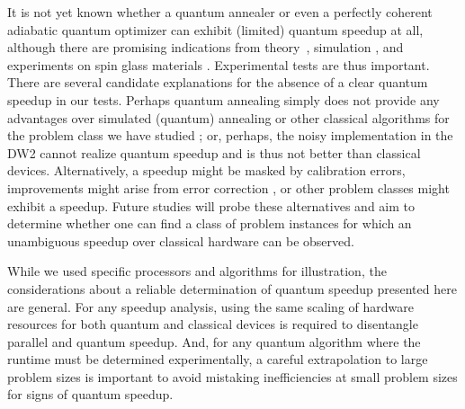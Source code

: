 It is not yet known whether a quantum annealer or even a perfectly coherent adiabatic quantum optimizer can exhibit (limited) quantum speedup at all, although there are promising indications from theory~\cite{Somma:2012kx}, simulation \cite{Santoro}, and experiments on spin glass materials \cite{Brooke1999}. Experimental tests are thus important. 
There are several candidate explanations for the absence of a clear quantum speedup in our tests. Perhaps quantum annealing simply does not provide any advantages over simulated (quantum) annealing or other classical algorithms for the problem class we have studied \cite{2014Katzgraber}; or, perhaps, the noisy implementation in the DW2 cannot realize quantum speedup and is thus not better than classical devices. Alternatively, a speedup might be masked by calibration errors, improvements might arise from error correction \cite{PAL:13}, or other problem classes might exhibit a speedup. Future studies will probe these alternatives and aim to determine whether one can find a class of problem instances for which an unambiguous speedup over classical hardware can be observed. 

While we used specific processors and algorithms for illustration, the considerations about a reliable determination of quantum speedup presented here are general. For any speedup analysis, using the same scaling of hardware resources for both quantum and classical devices is required to disentangle parallel and quantum speedup. And, for any quantum algorithm where the runtime must be determined experimentally, a careful extrapolation to large problem sizes is important to avoid mistaking inefficiencies at small problem sizes for signs of quantum speedup.





